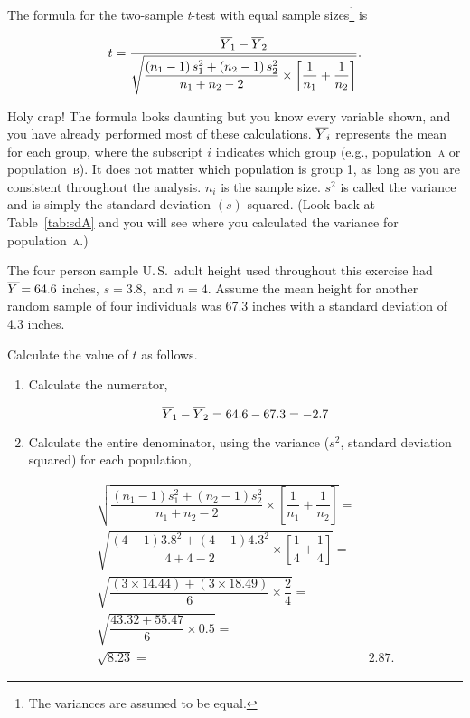 \documentclass[12pt]{exam}
\newcommand*\meanY{\overline{Y\kern1.67pt}\kern-1.67pt}
\newcommand*\ttest{\emph{t}-test}
\newcommand*\popa{population~\textsc{a}} %
\newcommand*\popb{population~\textsc{b}} %
\begin{document}
\begin{questions}
The formula for the two-sample \ttest{} with equal sample sizes\footnote{The variances are assumed to be equal.} is


\begin{equation*}
t = \dfrac{\meanY_1 - \meanY_2}{\sqrt{\dfrac{\left(n_1 - 1\right)s_1^2 + \left(n_2 - 1\right)s_2^2}{n_1 + n_2 -2} \times \left[\dfrac{1}{n_1} + \dfrac{1}{n_2}\right]}}.
\end{equation*}

Holy crap! The formula looks daunting but you know every variable shown, and you have already performed most of these calculations. $\meanY_{i}$ represents the mean for each group, where the subscript $i$ indicates which group (e.g., \popa{} or \popb{}). It does not matter which population is group 1, as long as you are consistent throughout the analysis. $n_i$ is the sample size. $s^2$ is called the variance and is simply the standard deviation $\left(s\right)$ squared. (Look back at Table~\ref{tab:sdA} and you will see where you calculated the variance for \popa{}.) 

The four person sample U.\,S.\ adult height used throughout this exercise had $\meanY = 64.6$ inches, $s = 3.8,$ and $n = 4.$ Assume the mean height for another random sample of four individuals was 67.3 inches with a standard deviation of 4.3 inches.

Calculate the value of $t$ as follows.

\begin{enumerate}

\item Calculate the numerator,

\begin{equation*}
\meanY_1 - \meanY_2 = 64.6 - 67.3 = -2.7
\end{equation*}

\item Calculate the entire denominator, using the variance ($s^2$, standard deviation squared) for each population,

\begin{equation*}
	\begin{split}
		\sqrt{\dfrac{\left(n_1 - 1\right)s_1^2 + \left(n_2 - 1\right)s_2^2}{n_1 + n_2 -2} \times \left[\dfrac{1}{n_1} + \dfrac{1}{n_2}\right]} = & \\
%
		\sqrt{\dfrac{\left(4 - 1\right)3.8^2 + \left(4 - 1\right)4.3^2}{4 + 4 - 2} \times \left[\dfrac{1}{4} + \dfrac{1}{4}\right]} = & \\
%
		\sqrt{\dfrac{\left(3 \times 14.44\right) + \left(3 \times18.49 \right)}{6} \times \dfrac{2}{4}} = & \\
%
		\sqrt{\dfrac{43.32 + 55.47}{6} \times 0.5} = & \\
		\sqrt{8.23} = &\ 2.87.
	\end{split}
\end{equation*}


\end{enumerate}
\end{questions}
\end{document}
